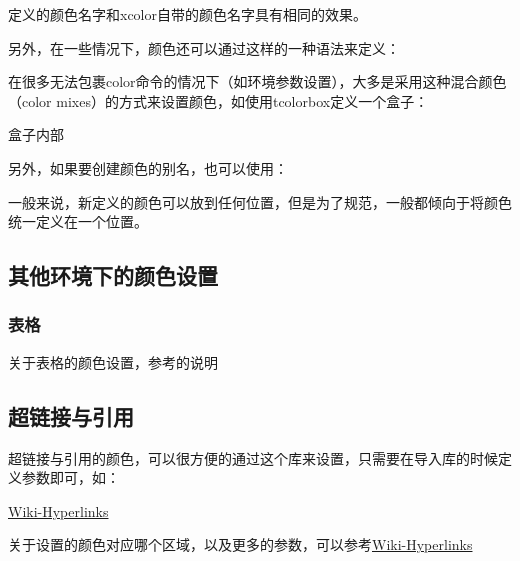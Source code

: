 定义的颜色名字和xcolor自带的颜色名字具有相同的效果。

另外，在一些情况下，颜色还可以通过这样的一种语法来定义：
\begin{texcode}%
\end{texcode}

在很多无法包裹color命令的情况下（如环境参数设置），大多是采用这种混合颜色（color mixes）的方式来设置颜色，如使用tcolorbox定义一个盒子：
\begin{texshow}
    \begin{tcolorbox}[colframe=blue!50!,colback=blue!20!]
        盒子内部
    \end{tcolorbox}
\end{texshow}

另外，如果要创建颜色的别名，也可以使用：
\begin{texcode}
\end{texcode}

一般来说，新定义的颜色可以放到任何位置，但是为了规范，一般都倾向于将颜色统一定义在一个位置。

\subsection{其他环境下的颜色设置}

\subsubsection{表格}\label{sssec:color-table}
关于表格的颜色设置，参考的说明

\subsection{超链接与引用}
超链接与引用的颜色，可以很方便的通过这个库来设置，只需要在导入库的时候定义参数即可，如：
\begin{texcode}
\usepackage[colorlinks,
linkcolor=black,
urlcolor=blue,
anchorcolor=blue,
citecolor=green]{hyperref}
\end{texcode}

\begin{texshow}
    \href{https://en.wikibooks.org/wiki/LaTeX/Hyperlinks}{Wiki-Hyperlinks}
\end{texshow}
关于设置的颜色对应哪个区域，以及更多的参数，可以参考\href{https://en.wikibooks.org/wiki/LaTeX/Hyperlinks}{Wiki-Hyperlinks}

